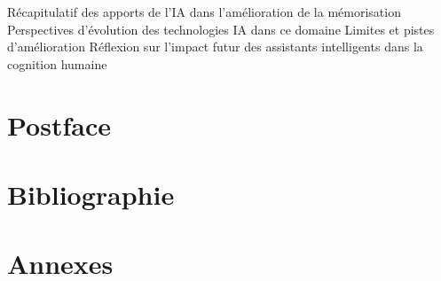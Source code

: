 \documentclass[12pt,a4paper]{report}
\begin{document}
Récapitulatif des apports de l'IA dans l'amélioration de la mémorisation
Perspectives d'évolution des technologies IA dans ce domaine
Limites et pistes d'amélioration
Réflexion sur l'impact futur des assistants intelligents dans la cognition humaine



\chapter*{Postface}

\chapter*{Bibliographie}

\chapter*{Annexes}
\end{document}
